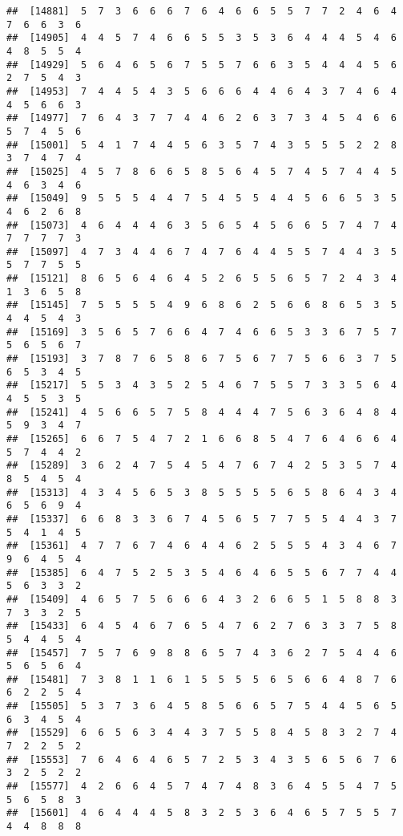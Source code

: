 \documentclass[
]{book}
\begin{document}
\begin{verbatim}
##  [14881]  5  7  3  6  6  6  7  6  4  6  6  5  5  7  7  2  4  6  4  7  6  6  3  6
##  [14905]  4  4  5  7  4  6  6  5  5  3  5  3  6  4  4  4  5  4  6  4  8  5  5  4
##  [14929]  5  6  4  6  5  6  7  5  5  7  6  6  3  5  4  4  4  5  6  2  7  5  4  3
##  [14953]  7  4  4  5  4  3  5  6  6  6  4  4  6  4  3  7  4  6  4  4  5  6  6  3
##  [14977]  7  6  4  3  7  7  4  4  6  2  6  3  7  3  4  5  4  6  6  5  7  4  5  6
##  [15001]  5  4  1  7  4  4  5  6  3  5  7  4  3  5  5  5  2  2  8  3  7  4  7  4
##  [15025]  4  5  7  8  6  6  5  8  5  6  4  5  7  4  5  7  4  4  5  4  6  3  4  6
##  [15049]  9  5  5  5  4  4  7  5  4  5  5  4  4  5  6  6  5  3  5  4  6  2  6  8
##  [15073]  4  6  4  4  4  6  3  5  6  5  4  5  6  6  5  7  4  7  4  7  7  7  7  3
##  [15097]  4  7  3  4  4  6  7  4  7  6  4  4  5  5  7  4  4  3  5  5  7  7  5  5
##  [15121]  8  6  5  6  4  6  4  5  2  6  5  5  6  5  7  2  4  3  4  1  3  6  5  8
##  [15145]  7  5  5  5  5  4  9  6  8  6  2  5  6  6  8  6  5  3  5  4  4  5  4  3
##  [15169]  3  5  6  5  7  6  6  4  7  4  6  6  5  3  3  6  7  5  7  5  6  5  6  7
##  [15193]  3  7  8  7  6  5  8  6  7  5  6  7  7  5  6  6  3  7  5  6  5  3  4  5
##  [15217]  5  5  3  4  3  5  2  5  4  6  7  5  5  7  3  3  5  6  4  4  5  5  3  5
##  [15241]  4  5  6  6  5  7  5  8  4  4  4  7  5  6  3  6  4  8  4  5  9  3  4  7
##  [15265]  6  6  7  5  4  7  2  1  6  6  8  5  4  7  6  4  6  6  4  5  7  4  4  2
##  [15289]  3  6  2  4  7  5  4  5  4  7  6  7  4  2  5  3  5  7  4  8  5  4  5  4
##  [15313]  4  3  4  5  6  5  3  8  5  5  5  5  6  5  8  6  4  3  4  6  5  6  9  4
##  [15337]  6  6  8  3  3  6  7  4  5  6  5  7  7  5  5  4  4  3  7  5  4  1  4  5
##  [15361]  4  7  7  6  7  4  6  4  4  6  2  5  5  5  4  3  4  6  7  9  6  4  5  4
##  [15385]  6  4  7  5  2  5  3  5  4  6  4  6  5  5  6  7  7  4  4  5  6  3  3  2
##  [15409]  4  6  5  7  5  6  6  6  4  3  2  6  6  5  1  5  8  8  3  7  3  3  2  5
##  [15433]  6  4  5  4  6  7  6  5  4  7  6  2  7  6  3  3  7  5  8  5  4  4  5  4
##  [15457]  7  5  7  6  9  8  8  6  5  7  4  3  6  2  7  5  4  4  6  5  6  5  6  4
##  [15481]  7  3  8  1  1  6  1  5  5  5  5  6  5  6  6  4  8  7  6  6  2  2  5  4
##  [15505]  5  3  7  3  6  4  5  8  5  6  6  5  7  5  4  4  5  6  5  6  3  4  5  4
##  [15529]  6  6  5  6  3  4  4  3  7  5  5  8  4  5  8  3  2  7  4  7  2  2  5  2
##  [15553]  7  6  4  6  4  6  5  7  2  5  3  4  3  5  6  5  6  7  6  3  2  5  2  2
##  [15577]  4  2  6  6  4  5  7  4  7  4  8  3  6  4  5  5  4  7  5  5  6  5  8  3
##  [15601]  4  6  4  4  4  5  8  3  2  5  3  6  4  6  5  7  5  5  7  4  4  8  8  8

\end{verbatim}
\end{document}
